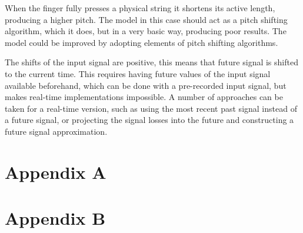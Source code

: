 \documentclass{sigchi}
\begin{document}
When the finger fully presses a physical string it shortens its active length, producing a higher pitch.
The model in this case should act as a pitch shifting algorithm, which it does, but in a very basic way, producing poor results.
The model could be improved by adopting elements of pitch shifting algorithms.

The shifts of the input signal are positive, this means that future signal is shifted to the current time.
This requires having future values of the input signal available beforehand, which can be done with a pre-recorded input signal, but makes real-time implementations impossible.
A number of approaches can be taken for a real-time version, such as using the most recent past signal instead of a future signal, or projecting the signal losses into the future and constructing a future signal approximation.




\clearpage
\appendix

\section{Appendix A}\label{appendix:math1}


\section{Appendix B}\label{appendix:math2}

\end{document}
